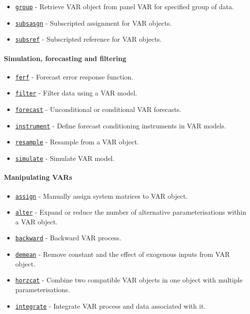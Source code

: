  \begin{itemize}
 \item
   \href{VAR/group}{\texttt{group}} - Retrieve VAR object from panel VAR
   for specified group of data.
 \item
   \href{VAR/subsasgn}{\texttt{subsasgn}} - Subscripted assignment for
   VAR objects.
 \item
   \href{VAR/subsref}{\texttt{subsref}} - Subscripted reference for VAR
   objects.
 \end{itemize}
 
 \paragraph{Simulation, forecasting and filtering}
 
 \begin{itemize}
 \item
   \href{VAR/ferf}{\texttt{ferf}} - Forecast error response function.
 \item
   \href{VAR/filter}{\texttt{filter}} - Filter data using a VAR model.
 \item
   \href{VAR/forecast}{\texttt{forecast}} - Unconditional or conditional
   VAR forecasts.
 \item
   \href{VAR/instrument}{\texttt{instrument}} - Define forecast
   conditioning instruments in VAR models.
 \item
   \href{VAR/resample}{\texttt{resample}} - Resample from a VAR object.
 \item
   \href{VAR/simulate}{\texttt{simulate}} - Simulate VAR model.
 \end{itemize}
 
 \paragraph{Manipulating VARs}
 
 \begin{itemize}
 \item
   \href{VAR/assign}{\texttt{assign}} - Manually assign system matrices
   to VAR object.
 \item
   \href{VAR/alter}{\texttt{alter}} - Expand or reduce the number of
   alternative parameterisations within a VAR object.
 \item
   \href{VAR/backward}{\texttt{backward}} - Backward VAR process.
 \item
   \href{VAR/demean}{\texttt{demean}} - Remove constant and the effect of
   exogenous inputs from VAR object.
 \item
   \href{VAR/horzcat}{\texttt{horzcat}} - Combine two compatible VAR
   objects in one object with multiple parameterisations.
 \item
   \href{VAR/integrate}{\texttt{integrate}} - Integrate VAR process and
   data associated with it.
 \end{itemize}
 
